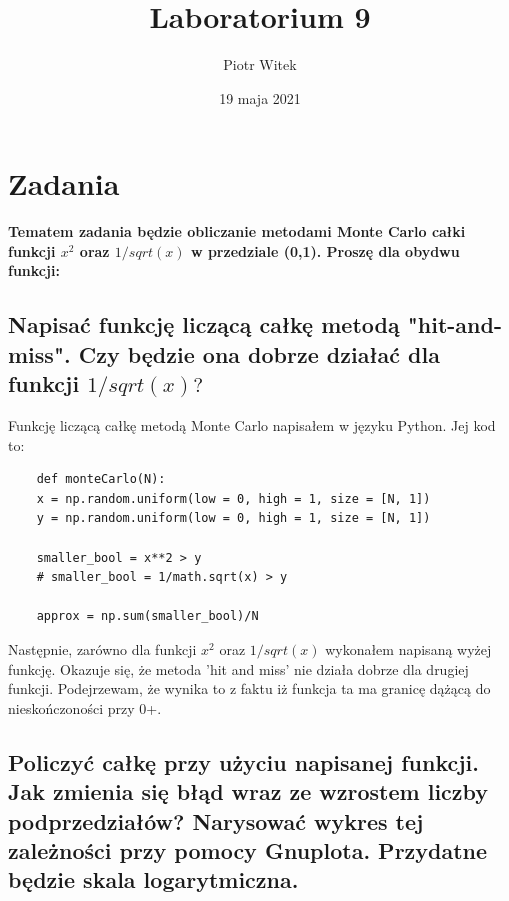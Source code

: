 \documentclass[5]{article}
\title{Laboratorium 9}
\author{Piotr Witek}
\date{19 maja 2021}
\begin{document}

\maketitle


\section{Zadania}

\hspace{4mm} \large \textbf{Tematem zadania będzie obliczanie metodami Monte Carlo całki funkcji $x^2$ oraz $1/sqrt(x)$ w przedziale (0,1). Proszę dla obydwu funkcji:}
\newline

\subsection{Napisać funkcję liczącą całkę metodą "hit-and-miss". Czy będzie ona dobrze działać dla funkcji $1/sqrt(x)?$}

\vspace{5mm}

Funkcję liczącą całkę metodą Monte Carlo napisałem w języku Python. Jej kod to:

\begin{verbatim}
    def monteCarlo(N):
    x = np.random.uniform(low = 0, high = 1, size = [N, 1])
    y = np.random.uniform(low = 0, high = 1, size = [N, 1])

    smaller_bool = x**2 > y
    # smaller_bool = 1/math.sqrt(x) > y

    approx = np.sum(smaller_bool)/N
\end{verbatim}

\vspace{5mm}
Następnie, zarówno dla funkcji $x^{2}$ oraz $1/sqrt(x)$ wykonałem napisaną wyżej funkcję.
Okazuje się, że metoda 'hit and miss' nie działa dobrze dla drugiej funkcji. Podejrzewam, że wynika to z faktu iż funkcja ta ma granicę dążącą do nieskończoności przy 0+.
\vspace{4mm}

\subsection{Policzyć całkę przy użyciu napisanej funkcji. Jak zmienia się błąd wraz ze wzrostem liczby podprzedziałów? Narysować wykres tej zależności przy pomocy Gnuplota. Przydatne będzie skala logarytmiczna.}
\end{document}
